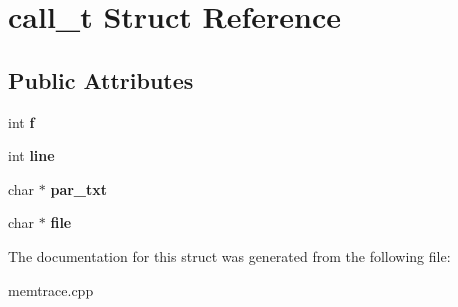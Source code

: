 \hypertarget{structcall__t}{}\section{call\+\_\+t Struct Reference}
\label{structcall__t}
\subsection*{Public Attributes}
\begin{DoxyCompactItemize}
\item 
\mbox{\label{structcall__t_a59d4e803f2e254dc5ceeb9c1bfcc9355}} 
int {\bfseries f}
\item 
\mbox{\label{structcall__t_aaa4f0e556289bbf4da414897b10e0916}} 
int {\bfseries line}
\item 
\mbox{\label{structcall__t_a24e185188a17e272396e118640672aba}} 
char $\ast$ {\bfseries par\+\_\+txt}
\item 
\mbox{\label{structcall__t_a97629ec51d024396221fe7d48c84859a}} 
char $\ast$ {\bfseries file}
\end{DoxyCompactItemize}


The documentation for this struct was generated from the following file\+:\begin{DoxyCompactItemize}
\item 
memtrace.\+cpp\end{DoxyCompactItemize}
